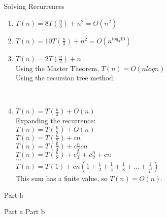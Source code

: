 \documentclass[12pt,twoside]{article}
\begin{document}
\begin{problems}
\begin{problemparts}
\problempart Solving Recurrences
\begin{enumerate}
	\item $T(n) = 8T(\frac{n}{3})+ n^2 = O(n^2)$
	\item $T(n) = 10T(\frac{n}{3})+ n^2 = O(n^{log_3 10})$
	\item $T(n) = 2T(\frac{n}{2})+ n$ \\
	Using the Master Theorem, $T(n)=O(n log n)$ \\
	Using the recursion tree method: \\
	
	
 \\
\bigskip
	
	\vspace{5mm}
	
	\item $T(n) = T(\frac{n}{2})+ O(n)$ \\
	Expanding the recurrence: \\
	$T(n) = T(\frac{n}{2}) + O(n)$ \\
	$T(n) = T(\frac{n}{2}) + cn $\\
	$T(n) = T(\frac{n}{4}) + c\frac{n}{2} cn$ \\
	$T(n) = T(\frac{n}{8}) + c\frac{n}{4} + c\frac{n}{2} + cn $\\
	$...$ \\
	$T(n) = T(1) + cn(1 + \frac{1}{2} + \frac{1}{4} + \frac{1}{8} + ... + \frac{1}{2^i})$ \\
	This sum has a finite value, so $T(n) = O(n)$.

\end{enumerate}


\problempart Part b %
\end{problemparts}

\problem  %

\begin{problemparts}
\problempart Part a %
\problempart Part b %
\end{problemparts}


\end{problems}
\end{document}
